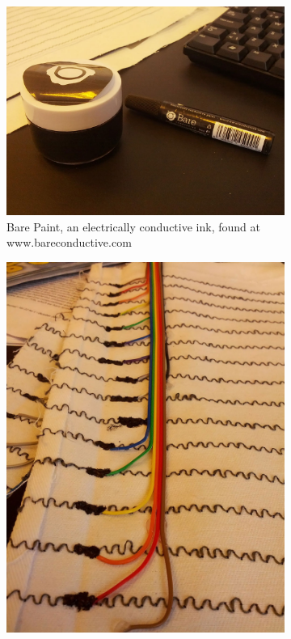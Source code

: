 \begin{figure}[t]
\centering
\begin{subfigure}[t]{.44\textwidth}
  \centering
  \includegraphics[width=\linewidth]{figures/touch/barepaint}
  \caption{Bare Paint, an electrically conductive ink, found at www.bareconductive.com}
\end{subfigure}%
\hspace{0.02\textwidth}
\begin{subfigure}[t]{.44\textwidth}
  \centering
  \includegraphics[width=\linewidth]{figures/touch/connectors}

\end{subfigure}
\end{figure}

